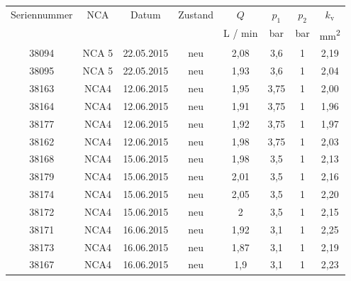 



\begin{tabular}{cccccccc}\toprule
Seriennummer & NCA & Datum & Zustand & $Q$ & $p_1$ & $p_2$ & $k_\mathrm{v}$ \\
 &  &  &  & L / min & bar & bar & \si{\milli\meter\squared} \\ 
 \midrule
38094 & NCA 5 & 22.05.2015 & neu & 2,08 & 3,6 & 1 & 2,19 \\
38095 & NCA 5 & 22.05.2015 & neu & 1,93 & 3,6 & 1 & 2,04 \\
38163 & NCA4 & 12.06.2015 & neu & 1,95 & 3,75 & 1 & 2,00 \\
38164 & NCA4 & 12.06.2015 & neu & 1,91 & 3,75 & 1 & 1,96 \\
38177 & NCA4 & 12.06.2015 & neu & 1,92 & 3,75 & 1 & 1,97 \\
38162 & NCA4 & 12.06.2015 & neu & 1,98 & 3,75 & 1 & 2,03 \\
38168 & NCA4 & 15.06.2015 & neu & 1,98 & 3,5 & 1 & 2,13 \\
38179 & NCA4 & 15.06.2015 & neu & 2,01 & 3,5 & 1 & 2,16 \\
38174 & NCA4 & 15.06.2015 & neu & 2,05 & 3,5 & 1 & 2,20 \\
38172 & NCA4 & 15.06.2015 & neu & 2 & 3,5 & 1 & 2,15 \\
38171 & NCA4 & 16.06.2015 & neu & 1,92 & 3,1 & 1 & 2,25 \\
38173 & NCA4 & 16.06.2015 & neu & 1,87 & 3,1 & 1 & 2,19 \\
38167 & NCA4 & 16.06.2015 & neu & 1,9 & 3,1 & 1 & 2,23 \\
\bottomrule
\end{tabular}



